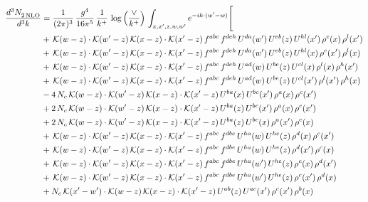 \documentclass[9pt]{article}
\numberwithin{equation}{section}
\begin{document}
\begin{align}
    \frac{d^{3}N_{2\,\rm NLO}^{\rm}}{d^{3}k}  & = \frac{1}{(2\pi)^{3}}\,\frac{g^{4}}{16\pi^{5}}\,\frac{1}{k^{+}}\,\log{\left(\frac{\vee}{k^{+}}\right)}\, \int_{x,x',z,w,w'}e^{-ik\cdot(w'-w)}\Bigg[\notag\\ &
    +\,\mathcal{K}(w-z)\cdot\mathcal{K}(w'-z)\,\mathcal{K}(x-z)\cdot\mathcal{K}(x'-z)\,f^{abc}\,f^{deh}\,U^{da}(w')\,U^{eb}(z)\,U^{hl}(x')\,\rho^{c}(x)\,\rho^{l}(x')\notag \\
&+\,\mathcal{K}(w-z)\cdot\mathcal{K}(w'-z)\,\mathcal{K}(x-z)\cdot\mathcal{K}(x'-z)\,f^{abc}\,f^{deh}\,U^{da}(w')\,U^{eb}(z)\,U^{hl}(x)\,\rho^{c}(x')\,\rho^{l}(x)\notag \\
&+\,\mathcal{K}(w-z)\cdot\mathcal{K}(w'-z)\,\mathcal{K}(x-z)\cdot\mathcal{K}(x'-z)\,f^{abc}\,f^{deh}\,U^{ad}(w)\,U^{be}(z)\,U^{cl}(x)\,\rho^{l}(x)\,\rho^{h}(x')\notag \\
&+\,\mathcal{K}(w-z)\cdot\mathcal{K}(w'-z)\,\mathcal{K}(x-z)\cdot\mathcal{K}(x'-z)\,f^{abc}\,f^{deh}\,U^{ad}(w)\,U^{be}(z)\,U^{cl}(x')\,\rho^{l}(x')\,\rho^{h}(x)\notag \\
&-4\,N_{c}\,\mathcal{K}(w-z)\cdot\mathcal{K}(w'-z)\,\mathcal{K}(x-z)\cdot\mathcal{K}(x'-z)\,U^{ba}(x)\,U^{bc}(x')\,\rho^{a}(x)\,\rho^{c}(x')\notag \\
&+2\,N_{c}\,\mathcal{K}(w-z)\cdot\mathcal{K}(w'-z)\,\mathcal{K}(x-z)\cdot\mathcal{K}(x'-z)\,U^{ba}(z)\,U^{bc}(x')\,\rho^{a}(x)\,\rho^{c}(x')\notag \\
&+2\,N_{c}\,\mathcal{K}(w-z)\cdot\mathcal{K}(w'-z)\,\mathcal{K}(x-z)\cdot\mathcal{K}(x'-z)\,U^{ba}(z)\,U^{bc}(x)\,\rho^{a}(x')\,\rho^{c}(x)\notag \\
&+\,\mathcal{K}(w-z)\cdot\mathcal{K}(w'-z)\,\mathcal{K}(x-z)\cdot\mathcal{K}(x'-z)\,f^{abc}\,f^{dbe}\,U^{ha}(w)\,U^{he}(z)\,\rho^{d}(x)\,\rho^{c}(x')\notag \\
&+\,\mathcal{K}(w-z)\cdot\mathcal{K}(w'-z)\,\mathcal{K}(x-z)\cdot\mathcal{K}(x'-z)\,f^{abc}\,f^{dbe}\,U^{ha}(w)\,U^{he}(z)\,\rho^{d}(x')\,\rho^{c}(x)\notag \\
&+\,\mathcal{K}(w-z)\cdot\mathcal{K}(w'-z)\,\mathcal{K}(x-z)\cdot\mathcal{K}(x'-z)\,f^{abc}\,f^{dbe}\,U^{ha}(w')\,U^{he}(z)\,\rho^{c}(x)\,\rho^{d}(x')\notag \\
&+\,\mathcal{K}(w-z)\cdot\mathcal{K}(w'-z)\,\mathcal{K}(x-z)\cdot\mathcal{K}(x'-z)\,f^{abc}\,f^{dbe}\,U^{ha}(w')\,U^{he}(z)\,\rho^{c}(x')\,\rho^{d}(x)\notag \\
&+N_{c}\,\mathcal{K}(x'-w')\cdot\mathcal{K}(w-z)\,\mathcal{K}(x-z)\cdot\mathcal{K}(x'-z)\,U^{ab}(z)\,U^{ac}(x')\,\rho^{c}(x')\,\rho^{b}(x)\notag \\

\end{align}
\end{document}
